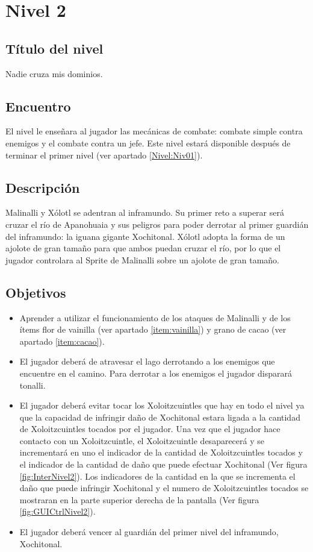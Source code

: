 \section{Nivel 2} \label{Nivel:Niv02}
	\subsection{Título del nivel}
	Nadie cruza mis dominios.
	\subsection{Encuentro}
El nivel le enseñara al jugador las mecánicas de combate: combate simple contra enemigos y el combate contra un jefe. Este nivel estará disponible después de terminar el primer nivel (ver apartado \ref{Nivel:Niv01}).
	\subsection{Descripción}
Malinalli y Xólotl se adentran al inframundo. Su primer reto a superar será cruzar el río de Apanohuaia y sus peligros para poder derrotar al primer guardián del inframundo: la iguana gigante Xochitonal. Xólotl adopta la forma de un ajolote de gran tamaño para que ambos puedan cruzar el río, por lo que el jugador controlara al Sprite de Malinalli sobre un ajolote de gran tamaño. 
	\subsection{Objetivos}
\begin{itemize}
	\item Aprender a utilizar el funcionamiento de los ataques de Malinalli y de los ítems flor de vainilla (ver apartado \ref{item:vainilla}) y grano de cacao (ver apartado \ref{item:cacao}).
	\item El jugador deberá de atravesar el lago derrotando a los enemigos que encuentre en el camino. Para derrotar a los enemigos el jugador disparará tonalli.
	\item El jugador deberá evitar tocar los Xoloitzcuintles que hay en todo el nivel ya que la capacidad de infringir daño de Xochitonal estara ligada a la cantidad de Xoloitzcuintles tocados por el jugador. Una vez que el jugador hace contacto con un Xoloitzcuintle, el Xoloitzcuintle desaparecerá y se incrementará en uno el indicador de la cantidad de Xoloitzcuintles tocados y el indicador de la cantidad de daño que puede efectuar Xochitonal (Ver figura \ref{fig:InterNivel2}). Los indicadores de la cantidad en la que se incrementa el daño que puede infringir Xochitonal y el numero de Xoloitzcuintles tocados se mostraran en la parte superior derecha de la pantalla (Ver figura \ref{fig:GUICtrlNivel2}).
	\item El jugador deberá vencer al guardián del primer nivel del inframundo, Xochitonal.
\end{itemize}

